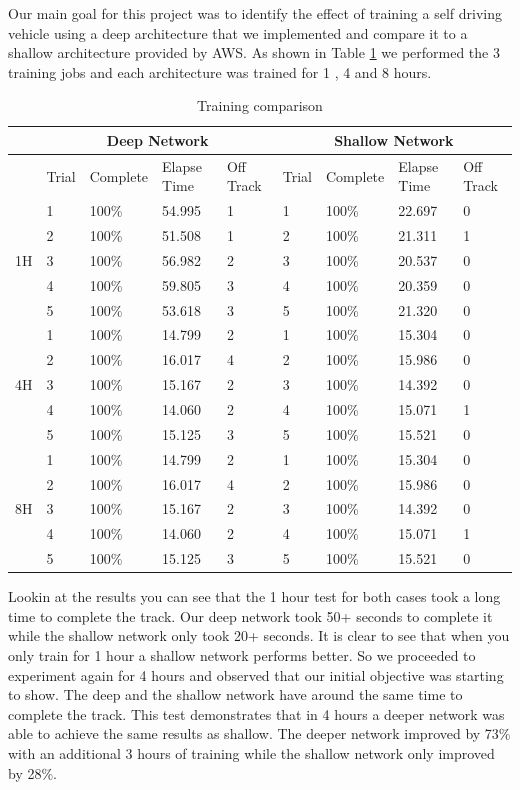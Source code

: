 \documentclass[journal]{IEEEtran}
\begin{document}
Our main goal for this project was to identify the effect of training a self driving vehicle using a deep architecture that we implemented and compare it to a shallow architecture provided by AWS.  As shown in Table \ref{mainTest} we performed the 3 training jobs and each architecture was trained for 1 , 4 and 8 hours. 

\begin{table}[t]
\centering
\caption{Training comparison}
\begin{tabular}{ |p{1cm}|p{1cm}|p{1.2cm}|p{1cm}|p{1cm}|p{1cm}|p{1.2cm}|p{1cm}|p{1cm}| }
\hline
 \multicolumn{1}{|c|}{} & \multicolumn{4}{|c|}{Deep Network} & \multicolumn{4}{|c|}{Shallow Network} \\
\hline
 & Trial &Complete & Elapse Time & Off Track &  Trial &Complete & Elapse Time & Off Track  \\
\hline
\multirow{5}{4em}{1H} & 1 &  100\% & 54.995 & 1 & 1 &  100\% & 22.697 & 0 \\ 
& 2 &  100\% & 51.508 & 1 & 2 &  100\% & 21.311 & 1  \\ 
& 3 &  100\% & 56.982 & 2 & 3 &  100\% & 20.537 & 0  \\
& 4 &  100\% & 59.805 & 3 & 4 &  100\% & 20.359 & 0  \\ 
& 5 &  100\% & 53.618 & 3 & 5 &  100\% & 21.320 & 0  \\
 \hline
\multirow{5}{4em}{4H} & 1 &  100\% & 14.799 & 2 & 1 &  100\% & 15.304 & 0 \\ 
& 2 &  100\% & 16.017 & 4 & 2 &  100\% & 15.986 & 0  \\ 
& 3 &  100\% & 15.167 & 2 & 3 &  100\% & 14.392 & 0  \\
& 4 &  100\% & 14.060 & 2 & 4 &  100\% & 15.071 & 1  \\ 
& 5 &  100\% & 15.125 & 3 & 5 &  100\% & 15.521 & 0  \\
 \hline
\multirow{5}{4em}{8H} & 1 &  100\% & 14.799 & 2 & 1 &  100\% & 15.304 & 0 \\ 
& 2 &  100\% & 16.017 & 4 & 2 &  100\% & 15.986 & 0  \\ 
& 3 &  100\% & 15.167 & 2 & 3 &  100\% & 14.392 & 0  \\
& 4 &  100\% & 14.060 & 2 & 4 &  100\% & 15.071 & 1  \\ 
& 5 &  100\% & 15.125 & 3 & 5 &  100\% & 15.521 & 0  \\
 \hline
\end{tabular}
\label{mainTest}
\end{table}

Lookin at the results you can see that the 1 hour test for both cases took a long time to complete the track.  Our deep network took 50+ seconds to complete it while the shallow network only took 20+ seconds.  It is clear to see that when you only train for 1 hour a shallow network performs better.  So we proceeded to experiment again for 4 hours and observed that our initial objective was starting to show.  The deep and the shallow network have around the same time to complete the track.  This test demonstrates that in 4 hours a deeper network was able to achieve the same results as shallow.  The deeper network improved by 73\% with an additional 3 hours of training while the shallow network only improved by 28\%.  
\end{document}
